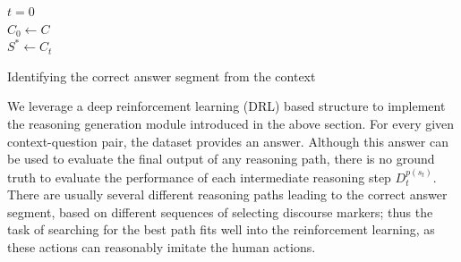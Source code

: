 \begin{algorithm}

  $t = 0$\\
  $C_0 \leftarrow C$\\
  $S^* \leftarrow C_t$\\
  \caption{Identifying the correct answer segment from the context}
  \label{segment_alg}
\end{algorithm}

We leverage a deep reinforcement learning (DRL) based structure to implement the reasoning generation module introduced in the above section. 
For every given context-question pair, the dataset provides an answer. Although this answer can be used to evaluate the final output of any reasoning path, there is no ground truth to evaluate the performance of each intermediate reasoning step $D^{p(s_t)}_t$. There are usually several different reasoning paths leading to the correct answer segment, based on different sequences of selecting discourse markers; thus the  task of searching for the best path fits well into the reinforcement learning, as these actions can reasonably imitate the human actions.

